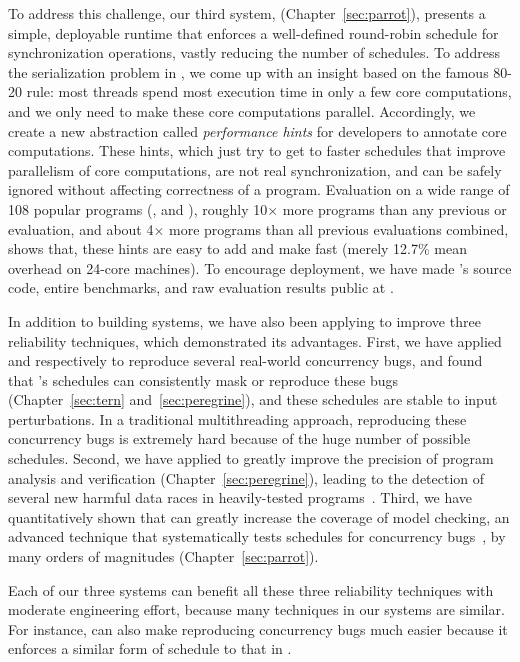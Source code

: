 To address this challenge, our third \smt system, \parrot 
(Chapter~\ref{sec:parrot}), presents a simple, deployable runtime that enforces 
a well-defined round-robin schedule for synchronization operations, vastly 
reducing the number of schedules. To address the serialization problem in \smt, 
we come up with an insight based on the famous 80-20 rule: most threads spend 
most execution time in only a few core computations, and we only need to make 
these core computations parallel. Accordingly, we create a new abstraction 
called \emph{performance hints} for developers to annotate core computations. 
These hints, which just try to get to faster schedules that improve parallelism 
of core computations, are not real synchronization, and can be safely ignored 
without affecting correctness of a program. Evaluation on a wide range of 108 
popular programs (\eg, \bdb and \mplayer), roughly 10$\times$ more programs 
than any previous \smt or \dmt evaluation, and about 4$\times$ more programs 
than all previous evaluations combined, shows that, these hints are easy to add 
and make \parrot fast (merely 12.7\% mean overhead on 24-core machines). To 
encourage \smt deployment, we have made \parrot's source code, entire 
benchmarks, and raw evaluation results public at \github.

In addition to building \smt systems, we have also been applying \smt to 
improve three reliability techniques, which demonstrated its advantages. First, 
we have applied \tern and \peregrine respectively to reproduce several 
real-world concurrency bugs, and found that \smt's schedules can consistently 
mask or reproduce these bugs (Chapter~\ref{sec:tern} and~\ref{sec:peregrine}), 
and these schedules are stable to input perturbations. In a traditional 
multithreading approach, reproducing these concurrency bugs is extremely hard 
because of the huge number of possible schedules. Second, we have applied 
\peregrine to greatly improve the precision of program 
analysis and verification (Chapter~\ref{sec:peregrine}), leading to the 
detection of several new harmful data races in heavily-tested 
programs~\cite{wu:pldi12}. Third, we have quantitatively shown that \parrot 
can greatly increase the coverage of model checking, an advanced technique that 
systematically tests schedules for concurrency bugs~\cite{parrot:sosp13, 
dbug:spin11, modist:nsdi09}, by many orders of magnitudes 
(Chapter~\ref{sec:parrot}).

Each of our three \smt systems can benefit all these three reliability 
techniques with moderate engineering effort, because many techniques in our 
\smt systems are similar. For instance, \parrot can also make reproducing 
concurrency bugs much easier because it enforces a similar form of schedule to 
that in \tern.

